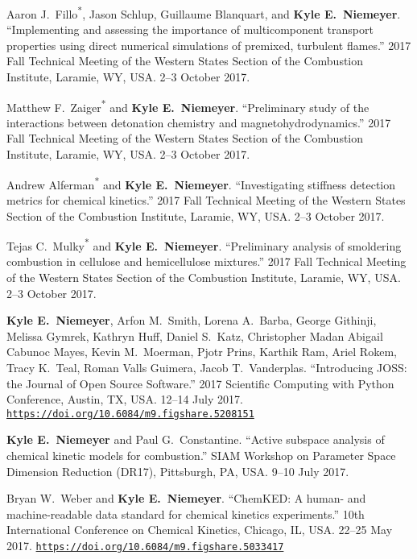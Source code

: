 \documentclass[margin,line,11pt]{res}
\makeatletter
\newlength{\bibhang}
\newlength{\bibsep}
 {\@listi \global\bibsep\itemsep \global\advance\bibsep by\parsep}
\newenvironment{bibenum*}
  {\renewcommand\labelenumi{\theenumi.}%
   \etaremune[
     topsep=0pt,
     itemsep=\bibsep,
     parsep=0pt,partopsep=0pt,
     itemindent=-\bibhang,
     leftmargin={\bibhang+\widthof{[999]}}]}
  {\endetaremune}
\newcommand*{\doi}[1]{\href{https://doi.org/#1}{\nolinkurl{https://doi.org/#1}}}
\newcommand*{\grad}[0]{\textsuperscript{*}}
\makeatother
\begin{document}
\begin{resume}
\begin{bibenum*}
\item Aaron J.~Fillo\grad{}, Jason Schlup, Guillaume Blanquart, and \textbf{Kyle E.~Niemeyer}.
``Implementing and assessing the importance of multicomponent transport properties using direct numerical simulations of premixed, turbulent flames.''
2017 Fall Technical Meeting of the Western States Section of the Combustion Institute,
Laramie, WY, USA.
2--3 October 2017.

\item Matthew F.~Zaiger\grad{} and \textbf{Kyle E.~Niemeyer}.
``Preliminary study of the interactions between detonation chemistry and magnetohydrodynamics.''
2017 Fall Technical Meeting of the Western States Section of the Combustion Institute,
Laramie, WY, USA.
2--3 October 2017.

\item Andrew Alferman\grad{} and \textbf{Kyle E.~Niemeyer}.
``Investigating stiffness detection metrics for chemical kinetics.''
2017 Fall Technical Meeting of the Western States Section of the Combustion Institute,
Laramie, WY, USA.
2--3 October 2017.

\item Tejas C.~Mulky\grad{} and \textbf{Kyle E.~Niemeyer}.
``Preliminary analysis of smoldering combustion in cellulose and hemicellulose mixtures.''
2017 Fall Technical Meeting of the Western States Section of the Combustion Institute,
Laramie, WY, USA.
2--3 October 2017.

\item \textbf{Kyle E.~Niemeyer}, Arfon M.~Smith, Lorena A.~Barba, George Githinji,
Melissa Gymrek, Kathryn Huff, Daniel S.~Katz, Christopher Madan Abigail Cabunoc Mayes,
Kevin M.~Moerman, Pjotr Prins, Karthik Ram, Ariel Rokem, Tracy K.~Teal,
Roman Valls Guimera, Jacob T.~Vanderplas.
``Introducing JOSS: the Journal of Open Source Software.''
2017 Scientific Computing with Python Conference, Austin, TX, USA.
12--14 July 2017.
\doi{10.6084/m9.figshare.5208151}

\item \textbf{Kyle E.~Niemeyer} and Paul G.~Constantine.
``Active subspace analysis of chemical kinetic models for combustion.''
SIAM Workshop on Parameter Space Dimension Reduction (DR17), Pittsburgh, PA, USA.
9--10 July 2017.

\item Bryan W.~Weber and \textbf{Kyle E.~Niemeyer}.
``ChemKED: A human- and machine-readable data standard for chemical kinetics experiments.''
10th International Conference on Chemical Kinetics, Chicago, IL, USA.
22--25 May 2017.
\doi{10.6084/m9.figshare.5033417}


\end{bibenum*}
\end{resume}
\end{document}
